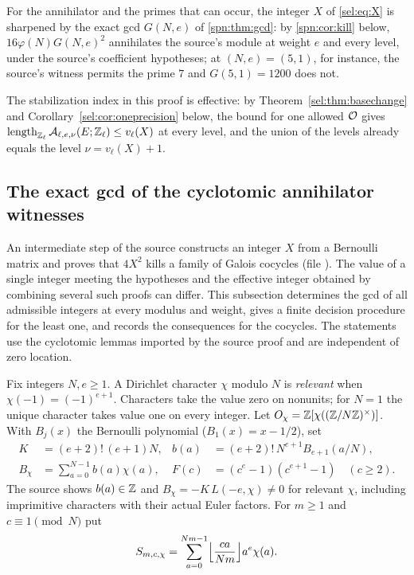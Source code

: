 For the annihilator and the primes that can occur, the integer $X$ of
\eqref{sel:eq:X} is sharpened by the exact gcd $G(N,e)$ of \cref{spn:thm:gcd}:
by \cref{spn:cor:kill} below, $16\varphi(N)G(N,e)^2$ annihilates the source's
module  at weight $e$ and every level, under the source's
coefficient hypotheses; at $(N,e)=(5,1)$, for instance, the source's witness
permits the prime $7$ and $G(5,1)=1200$ does not.

The stabilization index in this proof is effective: by
Theorem~\ref{sel:thm:basechange} and Corollary~\ref{sel:cor:oneprecision} below, the bound for one
allowed $\mathcal{O}$ gives
$\operatorname{length}_{\mathbb{Z}_\ell}\mathcal{A}_{\ell,e,\nu}(E;\mathbb{Z}_\ell)\le v_\ell(X)$ at every
level, and the union of the levels already equals the level
$\nu=v_\ell(X)+1$.

\subsection{The exact gcd of the cyclotomic annihilator witnesses}\label{spn:sec:annihilator}

An intermediate step of the source constructs an integer $X$ from a Bernoulli
matrix and proves that $4X^2$ kills a family of Galois cocycles (file
). The value of a single integer meeting
the hypotheses and the effective integer obtained by combining several such
proofs can differ. This subsection determines the gcd of all admissible
integers at every modulus and weight, gives a finite decision procedure for
the least one, and records the consequences for the cocycles. The statements
use the cyclotomic lemmas imported by the source proof and are independent of
zero location.

Fix integers $N,e\ge1$. A Dirichlet character $\chi$ modulo $N$ is
\emph{relevant} when $\chi(-1)=(-1)^{e+1}$. Characters take the value zero on
nonunits; for $N=1$ the unique character takes value one on every integer.
Let $O_\chi=\mathbb{Z}[\chi((\mathbb{Z}/N\mathbb{Z})^\times)]$. With $B_j(x)$ the Bernoulli
polynomial ($B_1(x)=x-1/2$), set
\begin{align*}
 K&=(e+2)!\,(e+1)N,& b(a)&=(e+2)!\,N^{e+1}B_{e+1}(a/N),\\
 B_\chi&=\sum_{a=0}^{N-1}b(a)\chi(a),& F(c)&=(c^e-1)(c^{e+1}-1)\quad(c\ge2).
\end{align*}
The source shows $b(a)\in\mathbb{Z}$ and $B_\chi=-K\,L(-e,\chi)\ne0$ for relevant
$\chi$, including imprimitive characters with their actual Euler factors.
For $m\ge1$ and $c\equiv1\pmod N$ put
\[
 S_{m,c,\chi}=\sum_{a=0}^{Nm-1}\floor*{\frac{ca}{Nm}}a^e\chi(a).
\]

